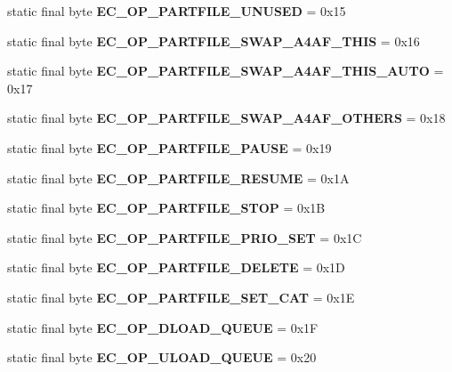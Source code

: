 \begin{DoxyCompactItemize}
\item 
static final byte {\bfseries EC\_\-OP\_\-PARTFILE\_\-UNUSED} = 0x15\label{interfaceECCodes_ab39daf9145b8a4b43dba3f965a2e5ccd}

\item 
static final byte {\bfseries EC\_\-OP\_\-PARTFILE\_\-SWAP\_\-A4AF\_\-THIS} = 0x16\label{interfaceECCodes_a000872cb37a0f590e94f7c33b3551337}

\item 
static final byte {\bfseries EC\_\-OP\_\-PARTFILE\_\-SWAP\_\-A4AF\_\-THIS\_\-AUTO} = 0x17\label{interfaceECCodes_ad877aa5f13268354cfde159c89e01c98}

\item 
static final byte {\bfseries EC\_\-OP\_\-PARTFILE\_\-SWAP\_\-A4AF\_\-OTHERS} = 0x18\label{interfaceECCodes_a566f7f8729e709b83374abc99ff050ec}

\item 
static final byte {\bfseries EC\_\-OP\_\-PARTFILE\_\-PAUSE} = 0x19\label{interfaceECCodes_abda2548baaa5d5d7a01d9637291f2470}

\item 
static final byte {\bfseries EC\_\-OP\_\-PARTFILE\_\-RESUME} = 0x1A\label{interfaceECCodes_ae47ddac75484c3a3d52d097dfa64a493}

\item 
static final byte {\bfseries EC\_\-OP\_\-PARTFILE\_\-STOP} = 0x1B\label{interfaceECCodes_a7e13404454d3e453db95fe9e6140851d}

\item 
static final byte {\bfseries EC\_\-OP\_\-PARTFILE\_\-PRIO\_\-SET} = 0x1C\label{interfaceECCodes_a56a1b30cc09ca34b251753dd0fb4975a}

\item 
static final byte {\bfseries EC\_\-OP\_\-PARTFILE\_\-DELETE} = 0x1D\label{interfaceECCodes_a331d5da0cfe735c07652f3f17c4516c8}

\item 
static final byte {\bfseries EC\_\-OP\_\-PARTFILE\_\-SET\_\-CAT} = 0x1E\label{interfaceECCodes_a0f25b2caaa27083d0e87fc6b8b80de6f}

\item 
static final byte {\bfseries EC\_\-OP\_\-DLOAD\_\-QUEUE} = 0x1F\label{interfaceECCodes_abb50f94a08a9dc31ba71737e714c2304}

\item 
static final byte {\bfseries EC\_\-OP\_\-ULOAD\_\-QUEUE} = 0x20\label{interfaceECCodes_a0ffcd67cf26e224ad6e2dd91544de5c8}


\end{DoxyCompactItemize}
